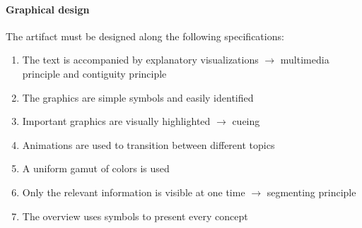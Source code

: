 \paragraph{Graphical design} The artifact must be designed along the following specifications:
\begin{enumerate}[nosep]
\setcounter{enumi}{\value{foo}}
    \item The text is accompanied by explanatory visualizations $\rightarrow$ multimedia principle and contiguity principle
    \item The graphics are simple symbols and easily identified
    \item Important graphics are visually highlighted $\rightarrow$ cueing
    \item Animations are used to transition between different topics
    \item A uniform gamut of colors is used
    \item Only the relevant information is visible at one time $\rightarrow$ segmenting principle
    \item The overview uses symbols to present every concept
\setcounter{foo}{\value{enumi}}
\end{enumerate}


